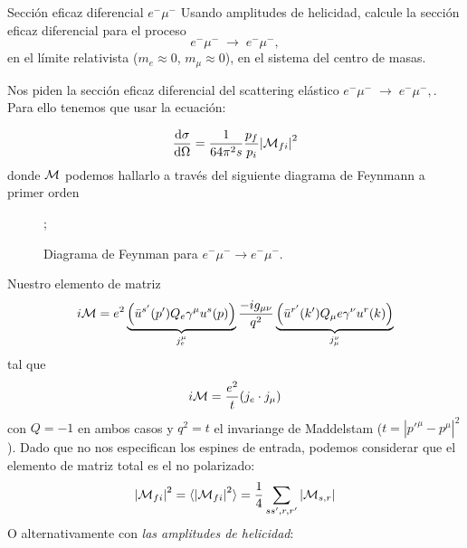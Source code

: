 

\begin{Ejercicio}{Sección eficaz diferencial $e^-\mu^-$}\label{Ej:12}
	Usando amplitudes de helicidad, calcule la sección eficaz diferencial para el proceso
	\[
		e^- \mu^- \;\to\; e^- \mu^-,
	\]
	en el límite relativista ($m_e \approx 0$, $m_\mu \approx 0$), en el sistema del centro de masas.
\end{Ejercicio}

Nos piden la sección eficaz diferencial del scattering elástico $e^- \mu^- \;\to\; e^- \mu^-,$. Para ello tenemos que usar la ecuación:

\begin{equation}
	\dv{\sigma}{\Omega} = \frac{1}{64 \pi^2 s} \frac{p_f}{p_i} \vqty{\Mcal_{fi}}^2
\end{equation}
donde $\mathcal{M}$ podemos hallarlo a través del siguiente diagrama de Feynmann a primer orden
\begin{figure}[h]
	\centering
	;
	\caption{Diagrama de Feynman para \(e^- \mu^- \to e^- \mu^-\).}
\end{figure}
Nuestro elemento de matriz
\begin{equation}
	i \Mcal =e^2 \underbrace{\pqty{\bar{u}^{s'}(p') Q_e  \gamma^\mu u^{s}(p)}}_{j_e^\mu}  \frac{-ig_{\mu \nu}}{q^2}  \underbrace{\pqty{\bar{u}^{r'}(k') Q_\mu e \gamma^\nu u^{r}(k)}}_{{j_\mu^\nu} }
\end{equation}
tal que
\begin{equation}
	i \mathcal{M} =\frac{e^2}{t} (j_e \cdot j_\mu)
\end{equation}
con $Q=-1$ en ambos casos y $q^2=t$ el invariange de Maddelstam ($t=|p'^\mu-p^\mu|^2$). Dado que no nos especifican los espines de entrada, podemos considerar que el elemento de matriz total es el no polarizado:
\begin{equation}
	\vqty{\Mcal_{fi}}^2 = \langle \vqty{\Mcal_{fi}}^2 \rangle = \frac{1}{4} \sum_{ss',r,r'} \vqty{\Mcal_{s,r}}
\end{equation}
O alternativamente con \textit{las amplitudes de helicidad}:
